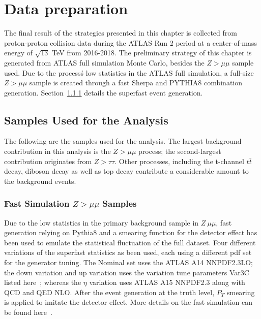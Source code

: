 \section{Data preparation}
The final result of the strategies presented in this chapter is collected from proton-proton collision data during the ATLAS Run 2 period at a center-of-mass energy of $\sqrt{13}$ TeV from 2016-2018. The preliminary strategy of this chapter is generated from ATLAS full simulation Monte Carlo, besides the $Z > \mu \mu $ sample used. Due to the process\'s low statistics in the ATLAS full simulation, a full-size $Z > \mu \mu$ sample is created through a fast Sherpa and PYTHIA8 combination
generation. Section~\ref{sec:fastsimulation} details the superfast event generation.

\subsection{Samples Used for the Analysis}
The following are the samples used for the analysis. The largest background contribution in this analysis is the $Z > \mu\mu $ process; the second-largest contribution originates from $Z > \tau \tau$. Other processes, including the t-channel $t\bar{t}$ decay, diboson decay as well as top decay contribute a considerable amount to the background events.

\subsubsection{Fast Simulation $Z > \mu\mu$  Samples}
\label{sec:fastsimulation}
Due to the low statistics in the primary background sample in  $Z \> \mu \mu$, fast generation relying on Pythia8 and a smearing function for the detector effect has been used to emulate the statistical fluctuation of the full dataset. Four different variations of the superfast statistics as been used, each using a different pdf set for the generator tuning. The Nominal set uses the ATLAS A14 NNPDF2.3LO; the down variation and up variation uses the variation tune parameters Var3C listed
here~\cite{ATL-PHYS-PUB-2014-021}; whereas the $\eta$ variation uses ATLAS A15 NNPDF2.3 along with QCD and QED NLO. After the event generation at the truth level, $P_{T}$ smearing is applied to imitate the detector effect. More details on the fast simulation can be found here~\cite{Artoni:2703492}.

